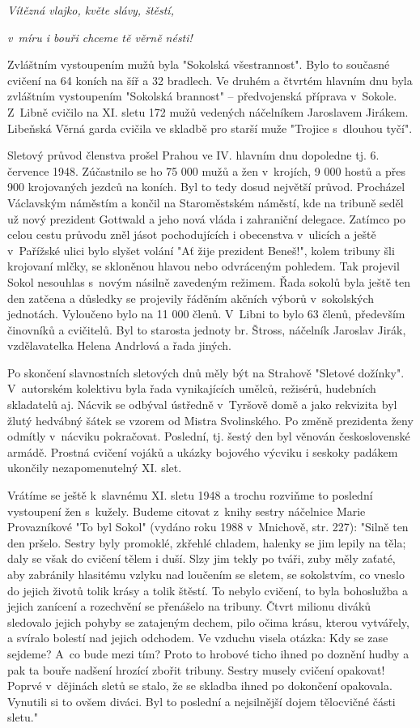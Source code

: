 \documentclass[a5paper, 11pt, twoside]{article}
\begin{document}
\textit{Vítězná vlajko, květe slávy, štěstí,}

\textit{v~míru i bouři chceme tě věrně nésti!}

Zvláštním vystoupením mužů byla "Sokolská všestrannost". Bylo to
současné cvičení na 64 koních na šíř a 32 bradlech. Ve druhém a čtvrtém
hlavním dnu byla zvláštním vystoupením "Sokolská brannost" --
předvojenská příprava v~Sokole. Z~Libně cvičilo na XI. sletu 172 mužů
vedených náčelníkem Jaroslavem Jirákem. Libeňská Věrná garda cvičila ve
skladbě pro starší muže "Trojice s~dlouhou tyčí".

Sletový průvod členstva prošel Prahou ve IV. hlavním dnu dopoledne tj.
6. července 1948. Zúčastnilo se ho 75 000 mužů a žen v~krojích, 9 000
hostů a přes 900 krojovaných jezdců na koních. Byl to tedy dosud
největší průvod. Procházel Václavským náměstím a končil na Staroměstském
náměstí, kde na tribuně seděl už nový prezident Gottwald a jeho nová
vláda i zahraniční delegace. Zatímco po celou cestu průvodu zněl jásot
pochodujících i obecenstva v~ulicích a ještě v~Pařížské ulici bylo
slyšet volání "Ať žije prezident Beneš!{}", kolem tribuny šli krojovaní
mlčky, se skloněnou hlavou nebo odvráceným pohledem. Tak projevil Sokol
nesouhlas s~novým násilně zavedeným režimem. Řada sokolů byla ještě ten
den zatčena a důsledky se projevily řáděním akčních výborů v~sokolských
jednotách. Vyloučeno bylo na 11 000 členů. V~Libni to bylo 63 členů,
především činovníků a cvičitelů. Byl to starosta jednoty br. Štross,
náčelník Jaroslav Jirák, vzdělavatelka Helena Andrlová a řada jiných.

Po skončení slavnostních sletových dnů měly být na Strahově "Sletové
dožínky". V~autorském kolektivu byla řada vynikajících umělců,
režisérů, hudebních skladatelů aj. Nácvik se odbýval ústředně v~Tyršově
domě a jako rekvizita byl žlutý hedvábný šátek se vzorem od Mistra
Svolinského. Po změně prezidenta ženy odmítly v~nácviku pokračovat.
Poslední, tj. šestý den byl věnován československé armádě. Prostná
cvičení vojáků a ukázky bojového výcviku i seskoky padákem ukončily
nezapomenutelný XI. slet.

Vrátíme se ještě k~slavnému XI. sletu 1948 a trochu rozviňme to poslední
vystoupení žen s~kužely. Budeme citovat z~knihy sestry náčelnice Marie
Provazníkové "To byl Sokol" (vydáno roku 1988 v~Mnichově, str. 227):
"Silně ten den pršelo. Sestry byly promoklé, zkřehlé chladem, halenky se
jim lepily na těla; daly se však do cvičení tělem i duší. Slzy jim tekly
po tváři, zuby měly zaťaté, aby zabránily hlasitému vzlyku nad loučením
se sletem, se sokolstvím, co vneslo do jejich životů tolik krásy a tolik
štěstí. To nebylo cvičení, to byla bohoslužba a jejich zanícení a
rozechvění se přenášelo na tribuny. Čtvrt milionu diváků sledovalo
jejich pohyby se zatajeným dechem, pilo očima krásu, kterou vytvářely, a
svíralo bolestí nad jejich odchodem. Ve vzduchu visela otázka: Kdy se
zase sejdeme? A~co bude mezi tím? Proto to hrobové ticho ihned po
doznění hudby a pak ta bouře nadšení hrozící zbořit tribuny. Sestry
musely cvičení opakovat! Poprvé v~dějinách sletů se stalo, že se skladba
ihned po dokončení opakovala. Vynutili si to ovšem diváci. Byl to
poslední a nejsilnější dojem tělocvičné části sletu."
\end{document}
